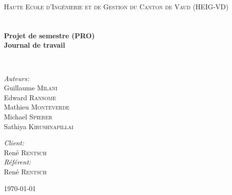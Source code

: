 \begin{titlepage}
    \begin{center}
        
        \textsc{\LARGE Haute Ecole d'Ingénierie et de Gestion du Canton de Vaud (HEIG-VD)}\\[1.5cm]
        
        \textsc{\Large }\\[0.5cm]
        
        \HRule \\[0.4cm]
        
        {\huge \bfseries Projet de semestre (PRO)\\
            Journal de travail \\[0.4cm] }
        
        \HRule \\[1.5cm]
        
        \begin{minipage}{0.4\textwidth}
            \begin{flushleft} \large
                \emph{Auteurs:}\\
                Guillaume \textsc{Milani}\\
                Edward \textsc{Ransome}\\
                Mathieu \textsc{Monteverde}\\
                Michael \textsc{Spierer}\\
                Sathiya \textsc{Kirushnapillai}
            \end{flushleft}
        \end{minipage}
        \begin{minipage}{0.4\textwidth}
            \begin{flushright} \large
                \emph{Client:} \\
                René \textsc{Rentsch}\\
                \emph{Référent:} \\
                René \textsc{Rentsch}\\
            \end{flushright}
        \end{minipage}
        
        \vfill
        
        {\large \today}
        
    \end{center}
\end{titlepage}
